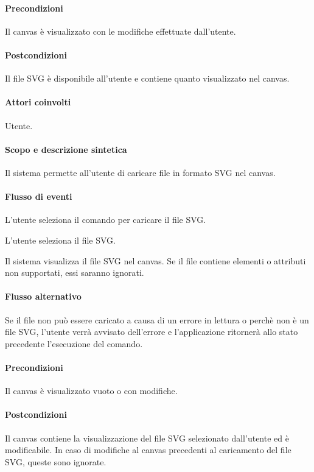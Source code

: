 \paragraph{Precondizioni} Il canvas \`e visualizzato con le modifiche effettuate dall'utente.
\paragraph{Postcondizioni} Il file SVG \`e disponibile all'utente e contiene quanto visualizzato nel canvas.

\paragraph{Attori coinvolti} Utente.
\paragraph{Scopo e descrizione sintetica} 
Il sistema permette all'utente di caricare file in formato SVG nel canvas.
\paragraph{Flusso di eventi}
\begin{elenconumerato}[\textbf{}]{\subsubsecindent}
\item L'utente seleziona il comando per caricare il file SVG.
\item L'utente seleziona il file SVG.
\item Il sistema visualizza il file SVG nel canvas. Se il file contiene elementi o attributi non supportati, essi saranno ignorati.
\end{elenconumerato}
\paragraph{Flusso alternativo}
Se il file non pu\`o essere caricato a causa di un errore in lettura o perch\`e non \`e un file SVG, l'utente verr\`a avvisato dell'errore e l'applicazione ritorner\`a allo stato precedente l'esecuzione del comando.
\paragraph{Precondizioni} Il canvas \`e visualizzato vuoto o con modifiche.
\paragraph{Postcondizioni} Il canvas contiene la visualizzazione del file SVG selezionato dall'utente ed \`e modificabile. In caso di modifiche al canvas precedenti al caricamento del file SVG, queste sono ignorate.

